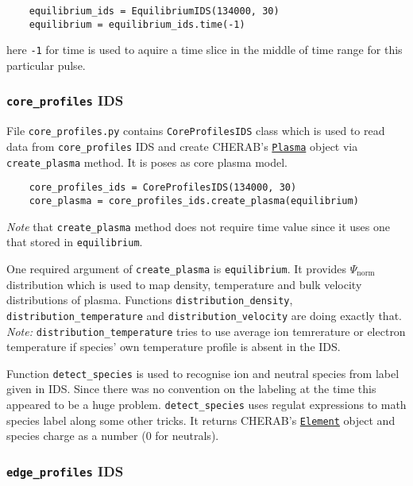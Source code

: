 \documentclass[../main.tex]{subfiles}
\begin{document}
\begin{verbatim}
    equilibrium_ids = EquilibriumIDS(134000, 30) 
    equilibrium = equilibrium_ids.time(-1)
\end{verbatim}
here \texttt{-1} for time is used to aquire a time slice in the middle of time range for this particular pulse.

\subsubsection{\texttt{core\_profiles} IDS}%
\label{sec:core_profiles_ids}

File \texttt{core\_profiles.py} contains \texttt{CoreProfilesIDS} class which is used to read data from \texttt{core\_profiles} IDS and create CHERAB's \href{https://cherab.github.io/documentation/plasmas/core_plasma_classes.html?highlight=plasma#cherab.core.Plasma}{\texttt{Plasma}} object via \texttt{create\_plasma} method. It is poses as core plasma model.

\begin{verbatim}
    core_profiles_ids = CoreProfilesIDS(134000, 30)
    core_plasma = core_profiles_ids.create_plasma(equilibrium)
\end{verbatim}
\emph{Note} that \texttt{create\_plasma} method does not require time value since it uses one that stored in \texttt{equilibrium}.

One required argument of \texttt{create\_plasma} is \texttt{equilibrium}. It provides $\Psi_\text{norm}$ distribution which is used to map density, temperature and bulk velocity distributions of plasma. Functions \texttt{distribution\_density}, \texttt{distribution\_temperature} and \texttt{distribution\_velocity} are doing exactly that. \emph{Note:} \texttt{distribution\_temperature} tries to use average ion temrerature or electron temperature if species' own temperature profile is absent in the IDS.

Function \texttt{detect\_species} is used to recognise ion and neutral species from label given in IDS. Since there was no convention on the labeling at the time this appeared to be a huge problem. \texttt{detect\_species} uses regulat expressions to math species label along some other tricks. It returns CHERAB's \href{https://cherab.github.io/documentation/atomic/elements_and_isotopes.html?highlight=element#cherab.core.atomic.elements.Element}{\texttt{Element}} object and species charge as a number (0 for neutrals).

\subsubsection{\texttt{edge\_profiles} IDS}%
\label{sec:edge_profiles_ids}
\end{document}
